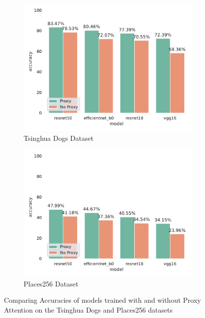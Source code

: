 \begin{figure}[H]
    \begin{subfigure}[h]{.5\textwidth}
        \includegraphics[width=\linewidth, right]{results/tsing_results.pdf}
        \caption{Tsinghua Dogs Dataset}
    \end{subfigure}
    \begin{subfigure}[h]{.5\textwidth}
        \includegraphics[width=\linewidth, left]{results/places256_results.pdf}
        \caption{Places256 Dataset}
    \end{subfigure}
    \caption{Comparing Accuracies of models trained with and without Proxy Attention on the Tsinghua Dogs and Places256 datasets}
    \label{fig:tsing_places256_results}
\end{figure}

